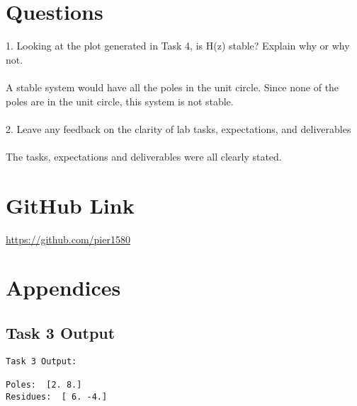 \section{Questions}
1. Looking at the plot generated in Task 4, is H(z) stable? Explain why or why not.
\\ \\
A stable system would have all the poles in the unit circle.  Since none of the poles are in the unit circle, this system is not stable. 
\\ \\
2. Leave any feedback on the clarity of lab tasks, expectations, and deliverables
\\ \\ 
The tasks, expectations and deliverables were all clearly stated.



\section{GitHub Link}
\url{https://github.com/pier1580}

\appendix
\section{Appendices}
\subsection{Task 3 Output}
\begin{scriptsize}
\begin{lstlisting}
Task 3 Output:

Poles:  [2. 8.]
Residues:  [ 6. -4.] 
\end{lstlisting}
\end{scriptsize}






